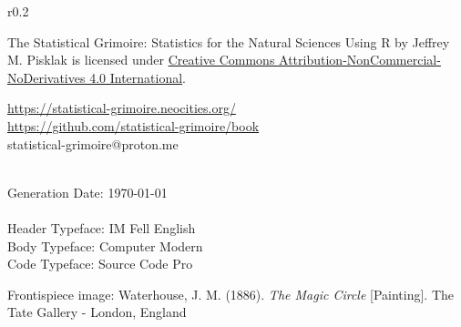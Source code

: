 \vspace*{\fill}

\setlength{\intextsep}{1pt}%
\setlength{\columnsep}{8pt}%
\begin{wrapfigure}{r}{0.2\textwidth}
\href{https://creativecommons.org/licenses/by-nc-nd/4.0/}{}
\end{wrapfigure}

{
\noindent
The Statistical Grimoire: Statistics for the Natural Sciences Using R by \mbox{Jeffrey} M. Pisklak is licensed under \href{https://creativecommons.org/licenses/by-nc-nd/4.0/}{Creative Commons Attribution-NonCommercial-NoDerivatives 4.0 International}.

\noindent
{} \url{https://statistical-grimoire.neocities.org/} \\
 \url{https://github.com/statistical-grimoire/book} \\
 statistical-grimoire@proton.me

\noindent
\luatexbanner \\
Generation Date: \today{} \\
\\
\noindent
Header Typeface: IM Fell English \\
Body Typeface: Computer Modern \\
Code Typeface: Source Code Pro \parencite{SourceCodePro}

\noindent
Frontispiece image: Waterhouse, J. M. (1886). \textit{The Magic Circle} [Painting]. The Tate Gallery - London, England
}



